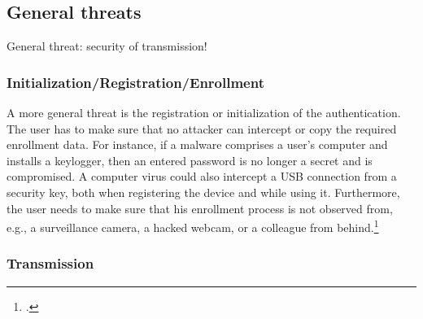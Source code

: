 \subsection{General threats}

General threat: security of transmission!

\subsubsection{Initialization/Registration/Enrollment}

A more general threat is the registration or initialization of the authentication. The user has to make sure that no attacker can intercept or copy the required enrollment data. For instance, if a malware comprises a user’s computer and installs a keylogger, then an entered password is no longer a secret and is compromised. A computer virus could also intercept a USB connection from a security key, both when registering the device and while using it. Furthermore, the user needs to make sure that his enrollment process is not observed from, e.g., a surveillance camera, a hacked webcam, or a colleague from behind.\footcites[See][152--153]{10.1007/978-3-642-39235-1_9}[See][61]{Ulqinaku:2019:FPP:3317549.3323404}

\subsubsection{Transmission}

